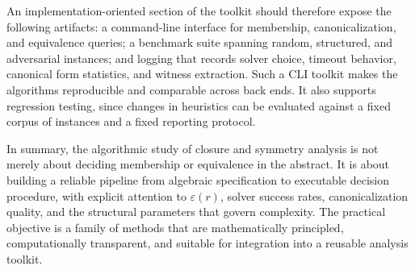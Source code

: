 \documentclass[11pt]{article}
\begin{document}
An implementation-oriented section of the toolkit should therefore expose the following artifacts: a command-line interface for membership, canonicalization, and equivalence queries; a benchmark suite spanning random, structured, and adversarial instances; and logging that records solver choice, timeout behavior, canonical form statistics, and witness extraction. Such a CLI toolkit makes the algorithms reproducible and comparable across back ends. It also supports regression testing, since changes in heuristics can be evaluated against a fixed corpus of instances and a fixed reporting protocol.

In summary, the algorithmic study of closure and symmetry analysis is not merely about deciding membership or equivalence in the abstract. It is about building a reliable pipeline from algebraic specification to executable decision procedure, with explicit attention to \(\varepsilon(r)\), solver success rates, canonicalization quality, and the structural parameters that govern complexity. The practical objective is a family of methods that are mathematically principled, computationally transparent, and suitable for integration into a reusable analysis toolkit.
\end{document}
